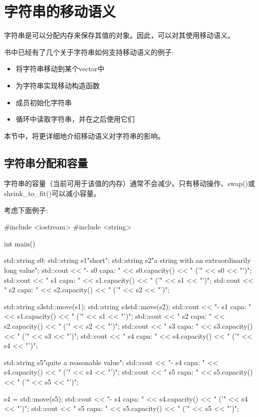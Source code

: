 \section{字符串的移动语义}
字符串是可以分配内存来保存其值的对象。因此，可以对其使用移动语义。

书中已经有了几个关于字符串如何支持移动语义的例子:

\begin{itemize}
	\item 将字符串移动到某个vector中
	\item 为字符串实现移动构造函数
	\item 成员初始化字符串
	\item 循环中读取字符串，并在之后使用它们
\end{itemize}

本节中，将更详细地介绍移动语义对字符串的影响。

\subsection{字符串分配和容量}

字符串的容量（当前可用于该值的内存）通常不会减少。只有移动操作、swap()或shrink_to_fit()可以减小容量。

考虑下面例子:

\begin{cppcode}
#include <iostream>
#include <string>

int main()
{
	std::string s0;
	std::string s1{"short"};
	std::string s2{"a string with an extraordinarily long value"};
	std::cout << "- s0 capa: " << s0.capacity() << " ('" << s0 << "')\n";
	std::cout << " s1 capa: " << s1.capacity() << " ('" << s1 << "')\n";
	std::cout << " s2 capa: " << s2.capacity() << " ('" << s2 << "')\n";

	std::string s3{std::move(s1)};
	std::string s4{std::move(s2)};
	std::cout << "- s1 capa: " << s1.capacity() << " ('" << s1 << "')\n";
	std::cout << " s2 capa: " << s2.capacity() << " ('" << s2 << "')\n";
	std::cout << " s3 capa: " << s3.capacity() << " ('" << s3 << "')\n";
	std::cout << " s4 capa: " << s4.capacity() << " ('" << s4 << "')\n";

	std::string s5{"quite a reasonable value"};
	std::cout << "- s4 capa: " << s4.capacity() << " ('" << s4 << "')\n";
	std::cout << " s5 capa: " << s5.capacity() << " ('" << s5 << "')\n";

	s4 = std::move(s5);
	std::cout << "- s4 capa: " << s4.capacity() << " ('" << s4 << "')\n";
	std::cout << " s5 capa: " << s5.capacity() << " ('" << s5 << "')\n";
}
\end{cppcode}


